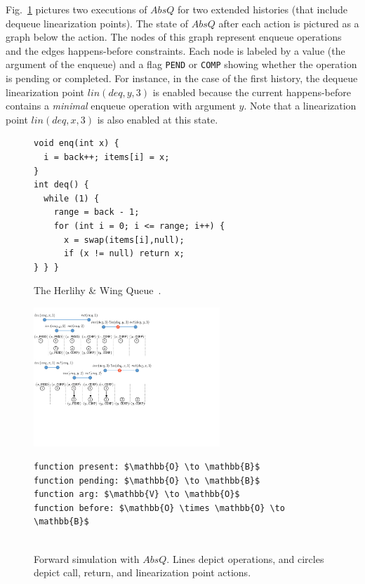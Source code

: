 Fig.~\ref{fig:queueSim} pictures two executions of $AbsQ$ for two extended histories (that include dequeue linearization points). The state of $AbsQ$ after each action is pictured as a graph below the action. The nodes of this graph represent enqueue operations and the edges happens-before constraints. Each node is labeled by a value (the argument of the enqueue) and a flag {\tt PEND} or {\tt COMP} showing whether the operation is pending or completed. For instance, in the case of the first history, the dequeue linearization point $lin(deq,y,3)$ is enabled because the current happens-before contains a \emph{minimal} enqueue operation with argument $y$. Note that a linearization point $lin(deq,x,3)$ is also enabled at this state.

\begin{figure}[t]
  \begin{minipage}[b]{0.55\linewidth}
    \begin{lstlisting}
void enq(int x) {
  i = back++; items[i] = x;
}
int deq() {
  while (1) {
    range = back - 1;
    for (int i = 0; i <= range; i++) {
      x = swap(items[i],null);
      if (x != null) return x;
} } }
    \end{lstlisting}
    \caption{The Herlihy \& Wing Queue~\cite{journals/toplas/HerlihyW90}.}
    \label{fig:HerlihyWing}
    \vspace{1em}

    \includegraphics[width=7cm]{fig-queue12}
    \caption{Forward simulation with $AbsQ$. Lines depict operations,
    and circles depict call, return, and linearization point actions.}
    \label{fig:queueSim}
  \end{minipage}
  \hfill
  \begin{minipage}[b]{0.4\linewidth}
    \begin{lstlisting}
function present: $\mathbb{O} \to \mathbb{B}$
function pending: $\mathbb{O} \to \mathbb{B}$
function arg: $\mathbb{V} \to \mathbb{O}$
function before: $\mathbb{O} \times \mathbb{O} \to \mathbb{B}$


\end{lstlisting}
\end{minipage}
\end{figure}
